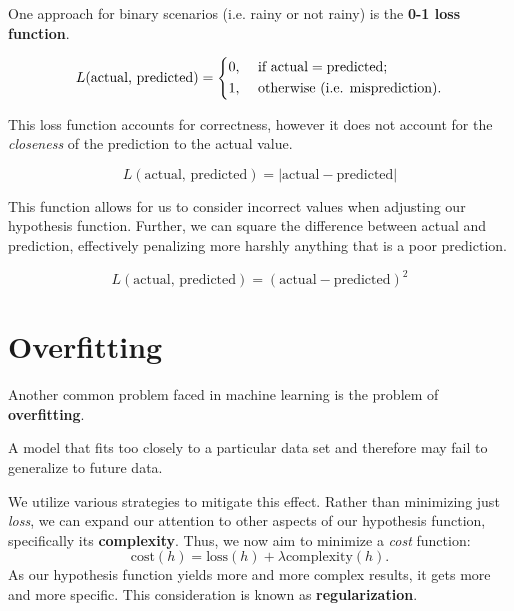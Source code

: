 One approach for binary scenarios (i.e. rainy or not rainy) is the \textbf{0-1 loss function}.

\begin{definition}
	\[
		L(\text{actual, predicted}) = \begin{dcases}
			0, &\text{ if } \text{actual}=\text{predicted} ;\\
			1, &\text{ otherwise (i.e. misprediction)} .
		\end{dcases}
	\]
\end{definition}

This loss function accounts for correctness, however it does not account for the \emph{closeness} of the prediction to the actual value.

\begin{definition}
	\[
		L(\text{actual, predicted})= \vert \text{actual} -\text{predicted}  \vert 
	\]
\end{definition}

This function allows for us to consider incorrect values when adjusting our hypothesis function. Further, we can square the difference between actual and prediction, effectively penalizing more harshly anything that is a poor prediction.

\begin{definition}
	\[
		L(\text{actual, predicted})= (\text{actual} - \text{predicted})^2 
	\]
\end{definition}

\section{Overfitting}
Another common problem faced in machine learning is the problem of \textbf{overfitting}.

\begin{definition}[Overfitting]
	A model that fits too closely to a particular data set and therefore may fail to generalize to future data.
\end{definition}

We utilize various strategies to mitigate this effect. Rather than minimizing just \emph{loss}, we can expand our attention to other aspects of our hypothesis function, specifically its \textbf{complexity}. Thus, we now aim to minimize a \emph{cost} function:
\[
	\text{cost} (h)=\text{loss} (h)+\lambda \text{complexity} (h).
\]
As our hypothesis function yields more and more complex results, it gets more and more specific. This consideration is known as \textbf{regularization}.


